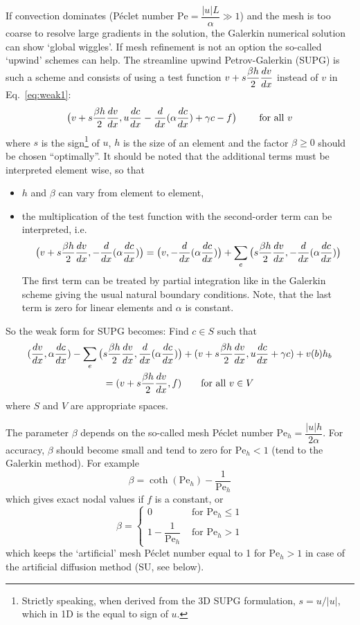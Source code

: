 If convection dominates (P\'eclet number $\mathrm{Pe}=\dfrac{|u|L}{\alpha}\gg1$)
and the mesh is too coarse to resolve large gradients in the solution, the
Galerkin numerical solution can show `global wiggles'.
If mesh refinement is not an
option the so-called `upwind' schemes can help. The streamline upwind
Petrov-Galerkin (SUPG) \cite{Brooks82} is such a scheme and consists of
using a test function
$v+s\dfrac{\beta h}2 \dfrac{d v}{d x}$ instead of $v$ in Eq.~\eqref{eq:weak1}:
\begin{equation}
   \big(v+s\dfrac{\beta h}2 \dfrac{d v}{d x},u \dfrac{d c}{d x} - \dfrac{d }{d x}(\alpha\dfrac{d c}{d x})
+ \gamma c - f\big)\qquad
  \text{ for all }v
\end{equation}
where $s$ is the sign\footnote{Strictly speaking, when derived from the 3D SUPG formulation, $s=u/|u|$, which in 1D  is the equal to sign of $u$.} of $u$, $h$ is the size of an element and the factor $\beta\geq0$ should be chosen
``optimally''. It should be noted that the additional terms must be interpreted
element wise, so that
\begin{itemize}
   \item $h$ and $\beta$ can vary from element to element,
   \item the multiplication of the test function with the second-order term can
be interpreted, i.e.
\[
   \big(v+s\dfrac{\beta h}2 \dfrac{d v}{d x}, - \dfrac{d }{d x}(\alpha\dfrac{d c}{d x})\big)=
   \big(v, - \dfrac{d }{d x}(\alpha\dfrac{d c}{d x})\big) + \sum_e
   \big(s\dfrac{\beta h}2 \dfrac{d v}{d x}, -\dfrac{d }{d x}(\alpha\dfrac{d c}{d x})\big)
\]
The first term can be treated by partial integration like in the Galerkin
scheme giving the usual natural boundary conditions. Note, that the last term
is zero for linear elements and $\alpha$ is constant.
\end{itemize}
So the weak form for SUPG becomes:
Find $c\in S$ such that
\begin{multline}
   (\dfrac{d v}{d x},\alpha\dfrac{d c}{d x})-
 \sum_e \big(s\dfrac{\beta h}2 \dfrac{d v}{d x}, \dfrac{d }{d x}(\alpha\dfrac{d c}{d x})\big)
+(v+s\dfrac{\beta h}2 \dfrac{d v}{d x},u\dfrac{d c}{d x}+\gamma c)
        +v(b)h_b\\
  =(v+s\dfrac{\beta h}2 \dfrac{d v}{d x},f)\qquad \text{for all }v\in V
\end{multline}
where $S$ and $V$ are appropriate spaces.

The parameter $\beta$ depends on the so-called mesh P\'eclet number 
$\mathrm{Pe}_h=\dfrac{|u|h}{2\alpha}$.
For accuracy, $\beta$ should become small 
and tend to zero for $\mathrm{Pe}_h<1$ (tend to the Galerkin method). For
example 
\[
    \beta=\coth(\mathrm{Pe}_h)-\frac1{\mathrm{Pe}_h}
\]
which gives exact nodal values if $f$ is a constant, or
\[
   \beta=
\begin{cases}
    0  & \text{ for }\mathrm{Pe}_h\leq1 \\
    1-\dfrac1{\mathrm{Pe}_h} & \text{ for }\mathrm{Pe}_h>1
\end{cases}
\]
which keeps the `artificial' mesh P\'eclet number equal to 1 for
$\mathrm{Pe}_h>1$ in case of the artificial diffusion method (SU, see below).

